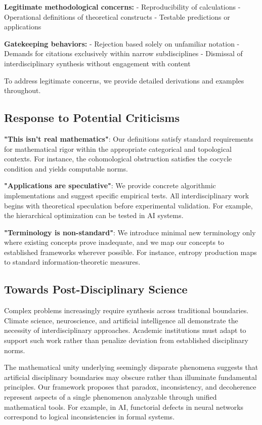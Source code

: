 \documentclass[12pt]{article}
\theoremstyle{plain}
\begin{document}
\textbf{Legitimate methodological concerns:}
- Reproducibility of calculations
- Operational definitions of theoretical constructs  
- Testable predictions or applications

\textbf{Gatekeeping behaviors:}
- Rejection based solely on unfamiliar notation
- Demands for citations exclusively within narrow subdisciplines
- Dismissal of interdisciplinary synthesis without engagement with content

To address legitimate concerns, we provide detailed derivations and examples throughout.

\subsection{Response to Potential Criticisms}

\textbf{"This isn't real mathematics"}: Our definitions satisfy standard requirements for mathematical rigor within the appropriate categorical and topological contexts. For instance, the cohomological obstruction satisfies the cocycle condition and yields computable norms.

\textbf{"Applications are speculative"}: We provide concrete algorithmic implementations and suggest specific empirical tests. All interdisciplinary work begins with theoretical speculation before experimental validation. For example, the hierarchical optimization can be tested in AI systems.

\textbf{"Terminology is non-standard"}: We introduce minimal new terminology only where existing concepts prove inadequate, and we map our concepts to established frameworks wherever possible. For instance, entropy production maps to standard information-theoretic measures.

\subsection{Towards Post-Disciplinary Science}

Complex problems increasingly require synthesis across traditional boundaries. Climate science, neuroscience, and artificial intelligence all demonstrate the necessity of interdisciplinary approaches. Academic institutions must adapt to support such work rather than penalize deviation from established disciplinary norms.

The mathematical unity underlying seemingly disparate phenomena suggests that artificial disciplinary boundaries may obscure rather than illuminate fundamental principles. Our framework proposes that paradox, inconsistency, and decoherence represent aspects of a single phenomenon analyzable through unified mathematical tools. For example, in AI, functorial defects in neural networks correspond to logical inconsistencies in formal systems.
\end{document}
